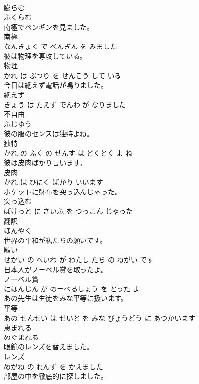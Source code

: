 \documentclass[8pt]{extreport}
\begin{document}
\begin{CJK}{UTF8}{min}
\\	膨らむ	
\\	ふくらむ			
\\	南極でペンギンを見ました。	
\\	南極 
\\	なんきょく で ぺんぎん を みました			
\\	彼は物理を専攻している。	
\\	物理 
\\	かれ は ぶつり を せんこう して いる			
\\	今日は絶えず電話が鳴りました。	
\\	絶えず 
\\	きょう は たえず でんわ が なりました			
\\	不自由	
\\	ふじゆう			
\\	彼の服のセンスは独特よね。	
\\	独特 
\\	かれ の ふく の せんす は どくとく よ ね			
\\	彼は皮肉ばかり言います。	
\\	皮肉 
\\	かれ は ひにく ばかり いいます			
\\	ポケットに財布を突っ込んじゃった。	
\\	突っ込む 
\\	ぽけっと に さいふ を つっこん じゃった			
\\	翻訳	
\\	ほんやく			
\\	世界の平和が私たちの願いです。	
\\	願い 
\\	せかい の へいわ が わたし たち の ねがい です			
\\	日本人がノーベル賞を取ったよ。	
\\	ノーベル賞 
\\	にほんじん が のーべるしょう を とった よ			
\\	あの先生は生徒をみな平等に扱います。	
\\	平等 
\\	あの せんせい は せいと を みな びょうどう に あつかいます			
\\	恵まれる	
\\	めぐまれる			
\\	眼鏡のレンズを替えました。	
\\	レンズ 
\\	めがね の れんず を かえました			
\\	部屋の中を徹底的に探しました。	

\end{CJK}
\end{document}
